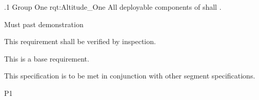 \ONERQMTVKSA
{\RqtNumberBase.1}
{Group One}
{rqt:Altitude_One}
{All deployable components of \ThisSys shall \TBD.}
{
	\item [Phase 1] Must past demonstration
}
{This requirement shall be verified by inspection.}
{
\item [N/A] This is a base requirement.
}
{
	\item This specification is to be met in conjunction with other segment specifications.
}
{P1}


